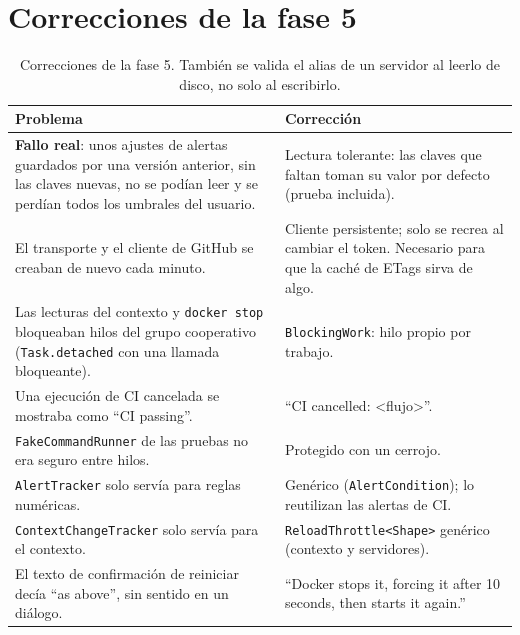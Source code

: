 \documentclass[11pt,a4paper]{article}
\begin{document}
\section{Correcciones de la fase 5}\label{sec:correcciones5}
\begin{table}[H]
\centering
\begin{tabularx}{\textwidth}{@{}XX@{}}
\toprule
\textbf{Problema} & \textbf{Corrección}\\
\midrule
\textbf{Fallo real}: unos ajustes de alertas guardados por una
versión anterior, sin las claves nuevas, no se podían leer y se
perdían todos los umbrales del usuario. & Lectura tolerante: las
claves que faltan toman su valor por defecto (prueba incluida).\\
El transporte y el cliente de GitHub se creaban de nuevo cada minuto.
& Cliente persistente; solo se recrea al cambiar el token. Necesario
para que la caché de ETags sirva de algo.\\
Las lecturas del contexto y \texttt{docker stop} bloqueaban hilos del
grupo cooperativo (\texttt{Task.detached} con una llamada
bloqueante). & \texttt{BlockingWork}: hilo propio por trabajo.\\
Una ejecución de CI cancelada se mostraba como ``CI passing''. &
``CI cancelled: <flujo>''.\\
\texttt{FakeCommandRunner} de las pruebas no era seguro entre hilos. &
Protegido con un cerrojo.\\
\texttt{AlertTracker} solo servía para reglas numéricas. & Genérico
(\texttt{AlertCondition}); lo reutilizan las alertas de CI.\\
\texttt{ContextChangeTracker} solo servía para el contexto. &
\texttt{ReloadThrottle<Shape>} genérico (contexto y servidores).\\
El texto de confirmación de reiniciar decía ``as above'', sin sentido
en un diálogo. & ``Docker stops it, forcing it after 10 seconds, then
starts it again.''\\
\bottomrule
\end{tabularx}
\caption{Correcciones de la fase 5. También se valida el alias de un
servidor al leerlo de disco, no solo al escribirlo.}
\end{table}
\end{document}
